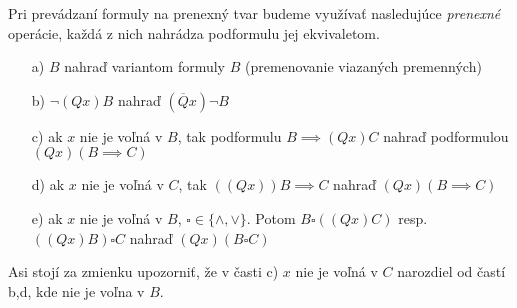Pri prevádzaní formuly na prenexný tvar budeme využívať nasledujúce
\emph{prenexné} operácie, každá z nich nahrádza podformulu
jej ekvivaletom.
\begin{itemize}
    \item[a)] $B$ nahraď variantom formuly $B$ (premenovanie viazaných
    premenných)
    \item[b)] $\neg(Q x) B$ nahraď $(\overline{Q} x) \neg B$
    \item[c)] ak $x$ nie je voľná v $B$, tak podformulu $B\implies (Qx)C$
            nahraď podformulou $(Qx) (B\implies C)$
    \item[d)] ak $x$ nie je voľná v $C$, tak $((Qx)) B \implies C$
        nahraď $(Qx) (B \implies C)$
    \item[e)] ak $x$ nie je voľná v $B$, $\square \in \{\land,\lor\}$.
     Potom $B \square ((Qx)C)$ resp. $((Qx)B)\square C$ nahraď
     $(Qx)(B \square C)$
\end{itemize}
\begin{poznamka}
    Asi stojí za zmienku upozorniť, že v časti c) $x$ nie je voľná v
    $C$ narozdiel od častí b,d, kde nie je voľna v $B$.
\end{poznamka}

